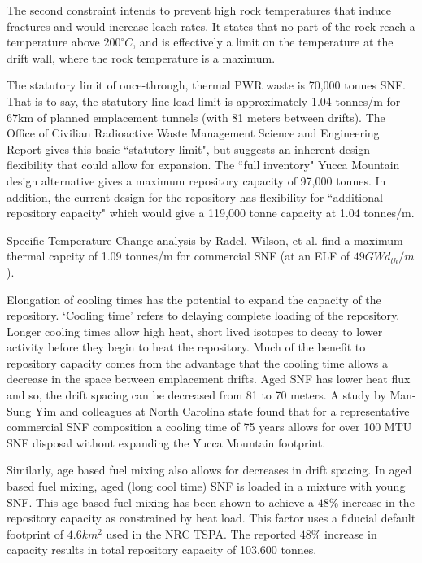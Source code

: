 The second constraint intends to prevent high rock temperatures that induce
fractures and would increase leach rates. It states that no part of the rock
reach a temperature above $200^{\circ}C$, and is effectively a limit on the
temperature at the drift wall, where the rock temperature is a maximum.  







The statutory limit of once-through, thermal PWR waste is 70,000 tonnes SNF.
That is to say, the statutory line load limit is approximately 1.04 tonnes/m
for 67km of planned emplacement tunnels (with 81 meters between drifts). The
Office of Civilian Radioactive Waste Management Science and Engineering Report
gives this basic ``statutory limit", but suggests an inherent design
flexibility that could allow for expansion. The ``full inventory" Yucca
Mountain design alternative gives a maximum repository capacity of 97,000
tonnes. In addition, the current design for the repository has flexibility for
``additional repository capacity" which would give a 119,000 tonne capacity at
1.04 tonnes/m.\cite{ doe_yucca_2002}

Specific Temperature Change analysis by Radel, Wilson, et al. find a maximum
thermal capcity of 1.09 tonnes/m for commercial SNF (at an ELF of $49
GWd_{th}/m$).\cite{radel_effect_2007} 

Elongation of cooling times has the potential to expand the capacity of the
repository. `Cooling time' refers to delaying complete loading of the
repository. Longer cooling times allow high heat, short lived isotopes to decay
to lower activity before they begin to heat the repository. Much of the benefit
to repository capacity comes from the advantage that the cooling time allows a
decrease in the space between emplacement drifts. Aged SNF has lower heat flux
and so, the drift spacing can be decreased from 81 to 70 meters. A study by
Man-Sung Yim and colleagues at North Carolina state found that for a
representative commercial SNF composition a cooling time of 75 years allows for
over 100 MTU SNF disposal without expanding the Yucca Mountain
footprint.\cite{li_examining_2007}

Similarly, age based fuel mixing also allows for decreases in drift spacing. In
aged based fuel mixing, aged (long cool time) SNF is loaded in a mixture with
young SNF. This age based fuel mixing has been shown to achieve a $48\%$
increase in the repository capacity as constrained by heat
load.\cite{nicholson_thermal_2007} This factor uses a fiducial default
footprint of $4.6 km^2$ used in the NRC TSPA.  The reported $48\%$ increase in
capacity results in total repository capacity of 103,600
tonnes.\cite{williams_contract_2001}

